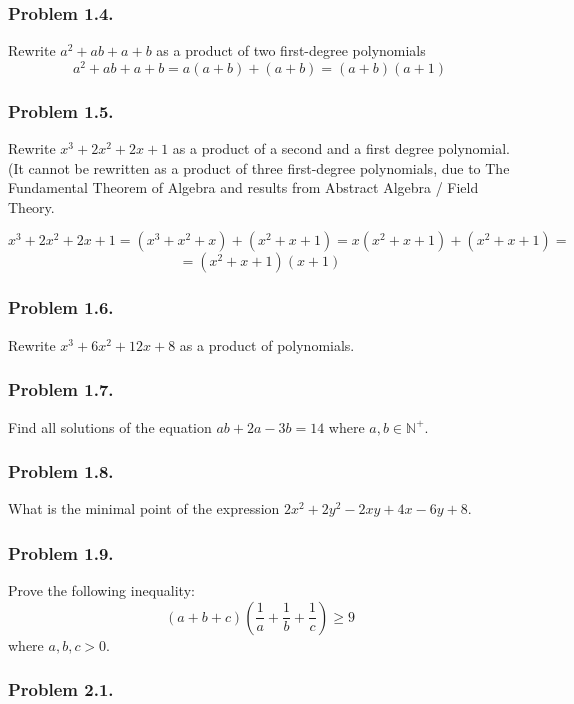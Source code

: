 \documentclass{article}
\begin{document}
\subsubsection{Problem 1.4.}
Rewrite $a^2 + ab + a + b$ as a product of two first-degree polynomials
\begin{equation}
    a^2 + ab + a + b = a(a+b) + (a+b) = (a + b) (a + 1)
\end{equation}

\subsubsection{Problem 1.5.}
Rewrite $x^3 + 2x^2 + 2x + 1$ as a product of a second and a first degree polynomial. (It cannot be rewritten as a product of three first-degree polynomials, due to The Fundamental Theorem of Algebra and results from Abstract Algebra / Field Theory.

\begin{equation}
    x^3 + 2x^2 + 2x + 1 = (x^3 + x^2 + x) + (x^2 + x + 1) = x(x^2 + x + 1) + (x^2 + x + 1) =
\end{equation}
\begin{equation}
    = (x^2 + x + 1)(x + 1)
\end{equation}

\subsubsection{Problem 1.6.}
Rewrite $x^3 + 6x^2 + 12x + 8$ as a product of polynomials.

\subsubsection{Problem 1.7.}
Find all solutions of the equation $ab + 2a - 3b = 14$ where $a, b \in \mathbb{N^+}$.

\subsubsection{Problem 1.8.}
What is the minimal point of the expression $2x^2 + 2y^2 - 2xy + 4x -6y + 8$.

\subsubsection{Problem 1.9.}
Prove the following inequality:
\[
(a+b+c)(\frac{1}{a} + \frac{1}{b} + \frac{1}{c}) \ge 9
\]
where $a, b, c > 0$.

\subsubsection{Problem 2.1.}
\end{document}

